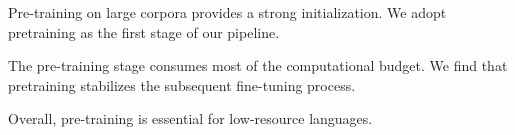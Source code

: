 Pre-training on large corpora provides a strong initialization. We adopt pretraining as the first stage of our pipeline.

The pre-training stage consumes most of the computational budget. We find that pretraining stabilizes the subsequent fine-tuning process.

Overall, pre-training is essential for low-resource languages.
